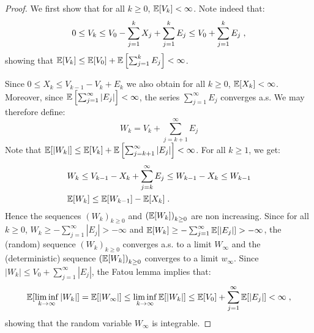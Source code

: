 \documentclass[final,12pt]{alt2022} %
\begin{document}
\begin{proof}
  We first show that for all $k \geq 0$, $\EE[V_k] < \infty$. Note indeed that:
\begin{equation}
0 \leq V_k \leq V_0 - \sum_{j=1}^{k}{X_j} + \sum_{j=1}^{k}{E_j}\leq V_0 + \sum_{j=1}^{k}{E_j} \eqsp,
\end{equation}
showing that $\EE[V_k] \leq \EE[V_0] + \EE\left[\sum_{j=1}^{k}{E_j}\right] < \infty$.

Since $0 \leq X_k \leq V_{k-1} - V_k + E_k$ we also obtain for all $k \geq 0$, $\EE[X_k] < \infty$. Moreover, since $\EE\left[\sum_{j=1}^{\infty}{|E_j|}\right] < \infty$, the series $\sum_{j=1}^{\infty}{E_j}$ converges a.s. We may therefore define:
\begin{equation}
W_k = V_k + \sum_{j=k+1}^{\infty}{E_j}
\end{equation}
Note that $\EE[|W_k|] \leq \EE[V_k]+\EE\left[\sum_{j=k+1}^{\infty}{|E_j|}\right] < \infty $. For all $k \geq 1$, we get:
\begin{equation}\label{chikbis}
\begin{split}
& W_{k} \leq V_{k-1} - X_{k} + \sum_{j=k}^{\infty}{E_j} \leq W_{k-1} - X_{k}\leq W_{k-1}\\
&\EE[W_k] \leq \EE[W_{k-1}] - \EE[X_{k}] \eqsp.
\end{split}
\end{equation}
Hence the sequences $(W_k)_{k\geq0}$ and $\left(\EE[W_k] \right)_{k\geq0}$ are non increasing. Since for all $k \geq 0$, $W_k \geq -  \sum_{j=1}^{\infty}{|E_j|} > -\infty$ and $\EE[W_k] \geq -  \sum_{j=1}^{\infty}{\EE[|E_j|]} > -\infty$, the (random) sequence $(W_k)_{k\geq0}$ converges a.s. to a limit $W_{\infty}$ and the (deterministic) sequence $\left(\EE[W_k] \right)_{k\geq0}$ converges to a limit $w_{\infty}$. Since $|W_k| \leq V_0 +  \sum_{j=1}^{\infty}{|E_j|}$, the Fatou lemma implies that:
\begin{equation}
\EE[\liminf \limits_{k \to \infty} |W_k|] = \EE[|W_{\infty}|] \leq \liminf \limits_{k \to \infty} \EE[|W_{k}|] \leq \EE[V_{0}] + \sum_{j=1}^{\infty}{\EE[|E_j|]}< \infty \eqsp,
\end{equation}
showing that the random variable $W_{\infty}$  is integrable.


\end{proof}
\end{document}
